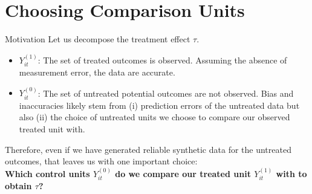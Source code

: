 \section{Choosing Comparison Units}

\begin{frame}{Motivation}
Let us decompose the treatment effect $\tau$. \\
\vspace{5pt}
\begin{itemize}
    \item $Y_{it}^{(1)}$: The set of treated outcomes is observed. Assuming the absence of measurement error, the data are accurate. 
    \vspace{-7pt}
    \item $Y_{it}^{(0)}$: The set of untreated potential outcomes are not observed. Bias and inaccuracies likely stem from (i) prediction errors of the untreated data but also (ii) the choice of untreated units we choose to compare our observed treated unit with.
\end{itemize}

Therefore, even if we have generated reliable synthetic data for the untreated outcomes, that leaves us with one important choice:\\ 
\vspace{5pt}
\centering
\textbf{Which control units $Y_{it}^{(0)}$ do we compare our treated unit $Y_{it}^{(1)}$ with to obtain $\tau$?}
\end{frame}


